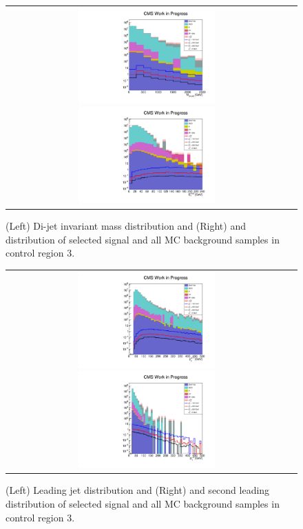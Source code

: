\begin{figure}[tbh!]
	\centering
	\begin{tabular}{cc}
		\includegraphics[width=0.5\textwidth]{analysis/pics/h_dijetinvariantmass_Tau2LooseIsoInclusive.pdf}
		\includegraphics[width=0.5\textwidth]{analysis/pics/h_met_Tau2LooseIsoInclusive.pdf} 		
	\end{tabular}
	\caption{(Left) Di-jet invariant mass distribution and (Right) and \met distribution of selected signal and all MC background samples in control region 3.}
	\label{fig::crplots1_Tau2LooseIsoInclusive_13tev}
\end{figure}

\begin{figure}[tbh!]
	\centering
	\begin{tabular}{cc}
		\includegraphics[width=0.5\textwidth]{analysis/pics/h_jet1pt_Tau2LooseIsoInclusive.pdf}
		\includegraphics[width=0.5\textwidth]{analysis/pics/h_tau2pt_Tau2LooseIsoInclusive.pdf} 		
	\end{tabular}
	\caption{(Left) Leading jet \pt distribution and (Right) and second leading \hadtau \pt distribution of selected signal and all MC background samples in control region 3.}
	\label{fig::crplots2_Tau2LooseIsoInclusive_13tev}
\end{figure}

